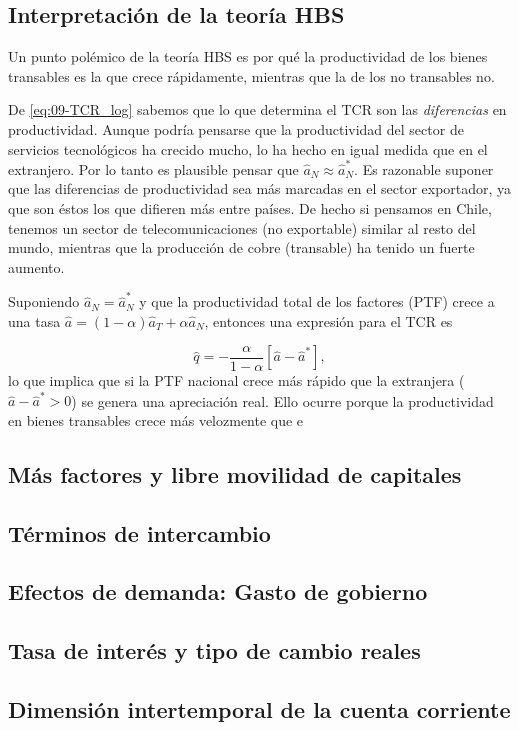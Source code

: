 \documentclass[DeGregorioResumen]{subfiles}
\begin{document}
\subsection{Interpretación de la teoría HBS}

Un punto polémico de la teoría HBS es por qué la productividad de los bienes transables es la que crece rápidamente, mientras que la de los no transables no.

De \eqref{eq:09-TCR_log} sabemos que lo que determina el TCR son las \emph{diferencias} en productividad. Aunque podría pensarse que la productividad del sector de servicios tecnológicos ha crecido mucho, lo ha hecho en igual medida que en el extranjero. Por lo tanto es plausible pensar que $\hat a_N \approx \hat a_N^*$. Es razonable suponer que las diferencias de productividad sea más marcadas en el sector exportador, ya que son éstos los que difieren más entre países. De hecho si pensamos en Chile, tenemos un sector de telecomunicaciones (no exportable) similar al resto del mundo, mientras que la producción de cobre (transable) ha tenido un fuerte aumento.

Suponiendo $\hat a_N = \hat a_N^*$ y que la productividad total de los factores (PTF) crece a una tasa $\hat a = (1-\alpha)\hat a_T + \alpha \hat a_N$, entonces una expresión para el TCR es

\begin{equation}
\hat q = -\frac{\alpha}{1-\alpha}[\hat a-\hat a^*],
\end{equation}
lo que implica que si la PTF nacional crece más rápido que la extranjera ($\hat a-\hat a^*>0$) se genera una apreciación real. Ello ocurre porque la productividad en bienes transables crece más velozmente que e
\subsection{Más factores y libre movilidad de capitales}
\subsection{Términos de intercambio}
\subsection{Efectos de demanda: Gasto de gobierno}
\subsection{Tasa de interés y tipo de cambio reales}
\subsection{Dimensión intertemporal de la cuenta corriente}
\end{document}
